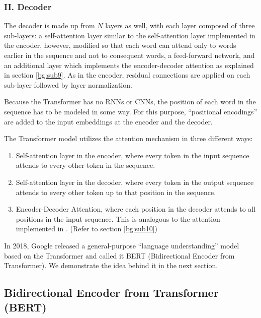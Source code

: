 

\subsubsection{II. Decoder} 
\label{bg:subsub13}

The decoder is made up from $N$ layers as well, with each layer composed of three sub-layers: a self-attention layer similar to the self-attention layer implemented in the encoder, however, modified so that each word can attend only to words earlier in the sequence and not to consequent words, a feed-forward network, and an additional layer which implements the encoder-decoder attention as explained in section \ref{bg:sub9}. As in the encoder, residual connections are applied on each sub-layer followed by layer normalization.


Because the Transformer has no \ac{RNN}s or \ac{CNN}s, the position of each word in the sequence has to be modeled in some way. For this purpose, \enquote{positional encodings} \cite{gehring2017convolutional} \cite{vaswani2017attention} are added to the input embeddings at the encoder and the decoder.


The Transformer model utilizes the attention mechanism in three different ways:
\begin{enumerate}
	\item Self-attention layer in the encoder, where every token in the input sequence attends to every other token in the sequence.
	\item Self-attention layer in the decoder, where every token in the output sequence attends to every other token up to that position in the sequence.
	\item Encoder-Decoder Attention, where each position in the decoder attends to all positions in the input sequence. This is analogous to the attention implemented in \cite{bahdanau2014neural}. (Refer to section \ref{bg:sub10})
\end{enumerate}


In 2018, Google released a general-purpose \enquote{language understanding} model based on the Transformer and called it \ac{BERT} (Bidirectional Encoder from Transformer). We demonstrate the idea behind it in the next section.

\subsection{Bidirectional Encoder from Transformer (BERT)} 
\label{bg:sub13}

